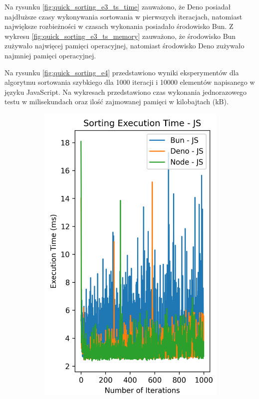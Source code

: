 Na rysunku \ref{fig:quick_sorting_e3_ts_time} zauważono, że Deno posiadał najdłuższe czasy wykonywania sortowania w pierwszych iteracjach, natomiast największe rozbieżności w czasach wykonania posiadało środowisko Bun. Z wykresu \ref{fig:quick_sorting_e3_ts_memory} zauważono, że środowisko Bun zużywało najwięcej pamięci operacyjnej, natomiast środowisko Deno zużywało najmniej pamięci operacyjnej.

Na rysunku \ref{fig:quick_sorting_e4} przedstawiono wyniki eksperymentów dla algorytmu sortowania szybkiego dla 1000 iteracji i 10000 elementów napisanego w języku JavaScript. Na wykresach przedstawiono czas wykonania jednorazowego testu w milisekundach oraz ilość zajmowanej pamięci w kilobajtach (kB).

\begin{figure}[H]
  \centering
  \begin{subfigure}[b]{0.44\textwidth}
    \centering
    \includegraphics[width=\textwidth]{Figures/sorting/sorting_quick_1000_10000_js_time.png}

\end{subfigure}
\end{figure}
